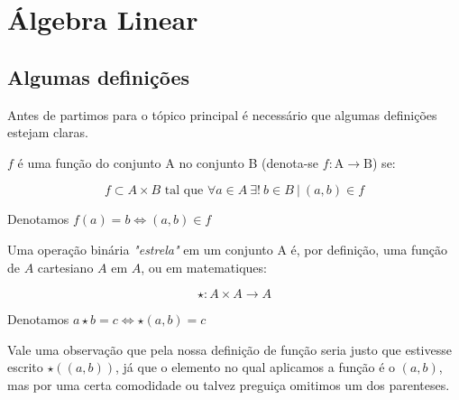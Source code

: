 \chapter{Álgebra Linear}

\section{Algumas definições}

Antes de partimos para o tópico principal é necessário que algumas definições estejam claras.

\begin{defn}


$f$ é uma função do conjunto A no conjunto B (denota-se $f: \text{A} \to \text{B}$) se:

\[f \subset A \times B \text{ tal que } \forall a \in A \ \exists ! \ b \in B \ | \ (a,b) \in f \]

Denotamos $f(a) = b \iff (a,b) \in f$
\end{defn}


\begin{defn}




Uma operação binária \emph{"estrela"} em um conjunto A é, por definição, uma função de $A$ cartesiano $A$ em $A$, ou em matematiques:

\[ \star : A \times A \to A \]

Denotamos $a \star b = c \iff \star(a,b) = c$

Vale uma observação que pela nossa definição de função seria justo que estivesse escrito $\star((a,b))$, já que o elemento no qual aplicamos a função é o $(a,b)$, mas por uma certa comodidade ou talvez preguiça omitimos um dos parenteses. 

\end{defn}

